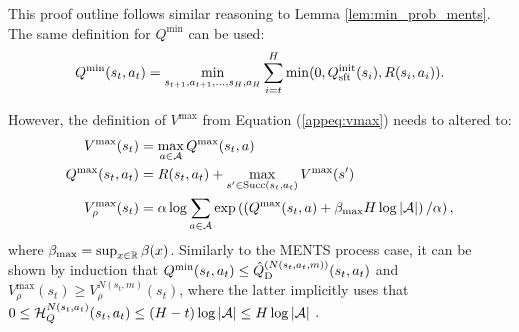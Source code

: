     \begin{proofoutline}
        This proof outline follows similar reasoning to Lemma \ref{lem:min_prob_ments}. The same definition for $Q^{\min}$ can be used:
        \begin{align}
            Q^{\min}(s_t,a_t) = \min_{s_{t+1},a_{t+1},...,s_H,a_H} \sum_{i=t}^H \min(0, Q^{\text{init}}_{{\textnormal{sft}}}(s_i), R(s_i,a_i)).
        \end{align}

        However, the definition of $V^{\max}$ from Equation (\ref{appeq:vmax}) needs to altered to:
        \begin{align}
            V^{\max}(s_t) &= \max_{a\in\mathcal{A}} Q^{\max}(s_t,a) \\
            Q^{\max}(s_t,a_t) &= R(s_t,a_t) + \max_{s'\in{\textnormal{Succ}(s_t,a_t)}} V^{\max}(s') \\
            V_\rho^{\max}(s_t) &= \alpha \log \sum_{a\in\mathcal{A}} \exp \left(\left(Q^{\max}(s_t,a) + \beta_{\max}H\log|\mathcal{A}| \right)/\alpha\right), 
        \end{align}
        where $\beta_{\max}=\sup_{x\in\mathbb{R}}\beta(x)$. Similarly to the MENTS process case, it can be shown by induction that $Q^{\min}(s_t,a_t)\leq {\hat{Q}^{(N(s_t,a_t,m))}_{{\textnormal{D}}}}(s_t,a_t)$ and $V_\rho^{\max}(s_t)\geq V_{\rho}^{N(s_t,m)}(s_t)$, where the latter implicitly uses that $0 \leq \mathcal{H}_Q^{N(s_t,a_t)}(s_t,a_t) \leq (H-t)\log|\mathcal{A}| \leq H\log|\mathcal{A}|$ . 
        

\end{proofoutline}
